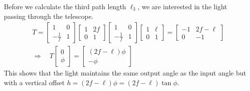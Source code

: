 \documentclass[12pt,hidelinks]{book}
\begin{document}
Before we calculate the third path length $\ell_3$, we are interested in the light passing through the telescope.
\begin{subequations}
\begin{align}
& T=\begin{bmatrix}
1 & 0 \\
-\frac{1}{f} & 1
\end{bmatrix}
\begin{bmatrix}
1 & 2f \\
0 & 1
\end{bmatrix}
\begin{bmatrix}
1 & 0 \\
-\frac{1}{f} & 1
\end{bmatrix}
\begin{bmatrix}
1 & \ell \\
0 & 1
\end{bmatrix}=
\begin{bmatrix}
-1 & 2f-\ell \\
0 & -1
\end{bmatrix} \\
& \Rightarrow\quad T
\begin{bmatrix}
0 \\ \phi
\end{bmatrix}=
\begin{bmatrix}
(2f-\ell)\phi \\ -\phi
\end{bmatrix}
\end{align}
\end{subequations}
This shows that the light maintains the same output angle as the input angle but with a vertical offset $h=(2f-\ell)\phi=(2f-\ell)\tan\phi$.
\end{document}
